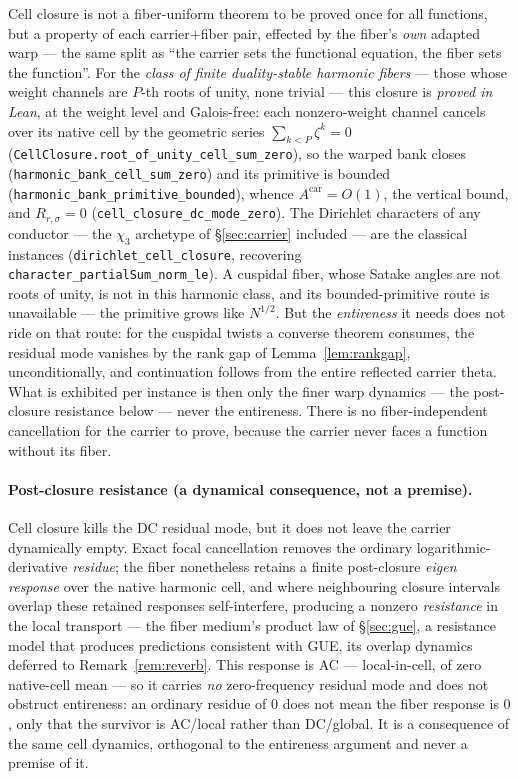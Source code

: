 \documentclass[11pt]{article}
\theoremstyle{definition}
\begin{document}
\noindent Cell closure is not a fiber-uniform theorem to be proved once for all functions, but a property
of each carrier$+$fiber pair, effected by the fiber's \emph{own} adapted warp --- the same split as ``the
carrier sets the functional equation, the fiber sets the function''. For the \emph{class of finite
duality-stable harmonic fibers} --- those whose weight channels are $P$-th roots of unity, none trivial ---
this closure is \emph{proved in Lean}, at the weight level and Galois-free: each nonzero-weight channel
cancels over its native cell by the geometric series $\sum_{k<P}\zeta^k=0$
(\texttt{CellClosure.root\_of\_unity\_cell\_sum\_zero}), so the warped bank closes
(\texttt{harmonic\_bank\_cell\_sum\_zero}) and its primitive is bounded
(\texttt{harmonic\_bank\_primitive\_bounded}), whence $A^{\mathrm{car}}=O(1)$, the vertical bound, and
$R_{r,\sigma}=0$ (\texttt{cell\_closure\_dc\_mode\_zero}). The Dirichlet characters of any conductor ---
the $\chi_3$ archetype of \S\ref{sec:carrier} included --- are the classical instances
(\texttt{dirichlet\_cell\_closure}, recovering \texttt{character\_partialSum\_norm\_le}). A cuspidal fiber,
whose Satake angles are not roots of unity, is not in this harmonic class, and its bounded-primitive route is
unavailable --- the primitive grows like $N^{1/2}$. But the \emph{entireness} it needs does not ride on that
route: for the cuspidal twists a converse theorem consumes, the residual mode vanishes by the rank gap of
Lemma~\ref{lem:rankgap}, unconditionally, and continuation follows from the entire reflected carrier theta.
What is exhibited per instance is then only the finer warp dynamics --- the post-closure resistance below ---
never the entireness. There is no fiber-independent cancellation for the carrier to prove, because the
carrier never faces a function without its fiber.

\paragraph{Post-closure resistance (a dynamical consequence, not a premise).} Cell closure kills the DC
residual mode, but it does not leave the carrier dynamically empty. Exact focal cancellation removes the
ordinary logarithmic-derivative \emph{residue}; the fiber nonetheless retains a finite post-closure
\emph{eigen response} over the native harmonic cell, and where neighbouring closure intervals overlap these
retained responses self-interfere, producing a nonzero \emph{resistance} in the local transport --- the
fiber medium's product law of \S\ref{sec:gue}, a resistance model that produces predictions consistent with
GUE, its overlap dynamics deferred to Remark~\ref{rem:reverb}. This response is AC --- local-in-cell, of
zero native-cell mean --- so it carries
\emph{no} zero-frequency residual mode and does not obstruct entireness: an ordinary residue of $0$ does not
mean the fiber response is $0$, only that the survivor is AC/local rather than DC/global. It is a
consequence of the same cell dynamics, orthogonal to the entireness argument and never a premise of it.
\end{document}
